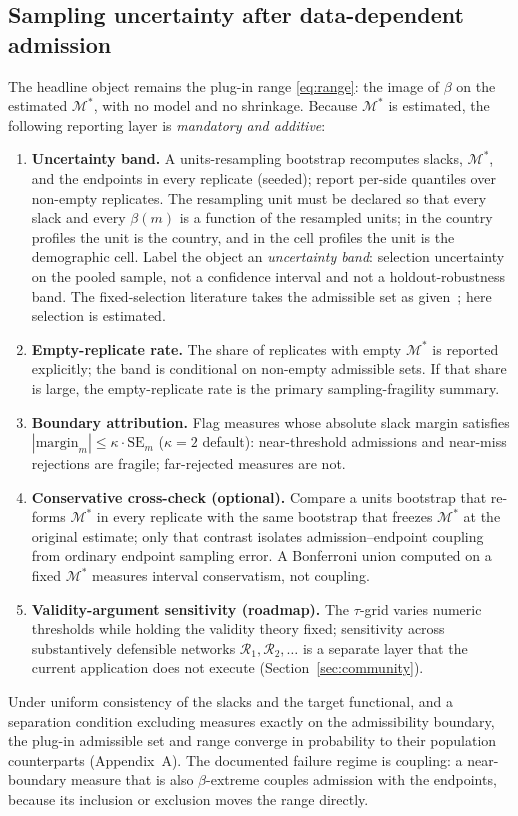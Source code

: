 \documentclass[10pt,letterpaper]{article}
\newcommand{\M}{\ensuremath{\mathcal{M}}}
\newcommand{\Rset}{\mathcal{R}}
\begin{document}
\subsection{Sampling uncertainty after data-dependent admission}
\label{sec:uncertainty}

The headline object remains the plug-in range \eqref{eq:range}: the image of $\beta$ on the estimated $\M^*$, with no model and no shrinkage.
Because $\M^*$ is estimated, the following reporting layer is \emph{mandatory and additive}:
\begin{enumerate}[label=(\roman*)]
\item \textbf{Uncertainty band.}
A units-resampling bootstrap recomputes slacks, $\M^*$, and the endpoints in every replicate (seeded); report per-side quantiles over non-empty replicates.
The resampling unit must be declared so that every slack and every $\beta(m)$ is a function of the resampled units; in the country profiles the unit is the country, and in the cell profiles the unit is the demographic cell.
Label the object an \emph{uncertainty band}: selection uncertainty on the pooled sample, not a confidence interval and not a holdout-robustness band.
The fixed-selection literature takes the admissible set as given~\cite{imbensmanski2004,stoye2009}; here selection is estimated.
\item \textbf{Empty-replicate rate.}
The share of replicates with empty $\M^*$ is reported explicitly; the band is conditional on non-empty admissible sets.
If that share is large, the empty-replicate rate is the primary sampling-fragility summary.
\item \textbf{Boundary attribution.}
Flag measures whose absolute slack margin satisfies $|\mathrm{margin}_m|\le\kappa\cdot\mathrm{SE}_m$ ($\kappa=2$ default): near-threshold admissions and near-miss rejections are fragile; far-rejected measures are not.
\item \textbf{Conservative cross-check (optional).}
Compare a units bootstrap that re-forms $\M^*$ in every replicate with the same bootstrap that freezes $\M^*$ at the original estimate; only that contrast isolates admission--endpoint coupling from ordinary endpoint sampling error.
A Bonferroni union computed on a fixed $\M^*$ measures interval conservatism, not coupling.
\item \textbf{Validity-argument sensitivity (roadmap).}
The $\tau$-grid varies numeric thresholds while holding the validity theory fixed; sensitivity across substantively defensible networks $\Rset_1,\Rset_2,\ldots$ is a separate layer that the current application does not execute (Section~\ref{sec:community}).
\end{enumerate}
Under uniform consistency of the slacks and the target functional, and a separation condition excluding measures exactly on the admissibility boundary, the plug-in admissible set and range converge in probability to their population counterparts (Appendix~A).
The documented failure regime is coupling: a near-boundary measure that is also $\beta$-extreme couples admission with the endpoints, because its inclusion or exclusion moves the range directly.
\end{document}
